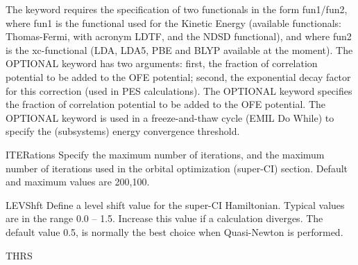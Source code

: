 \begin{keywordlist}
\begin{inputlisting}
\end{inputlisting}
The keyword  requires the specification of two functionals in the form fun1/fun2, where fun1 is the functional
used for the Kinetic Energy (available functionals: Thomas-Fermi, with acronym LDTF, and the NDSD functional), and where
fun2 is the xc-functional (LDA, LDA5, PBE and BLYP available at the moment).
The OPTIONAL keyword  has two arguments: first, the fraction of correlation potential to be added to the OFE potential;
second, the exponential decay factor for this correction (used in PES calculations).
The OPTIONAL keyword  specifies the fraction of correlation potential to be added to the OFE potential.
The OPTIONAL keyword  is used in a freeze-and-thaw cycle (EMIL Do While) to specify the (subsystems) energy convergence threshold.
\item[ITERations]
Specify the maximum number of
 iterations, and the maximum number of iterations used in the orbital
optimization (super-CI) section. Default and maximum values are 200,100.
\item[LEVShft]
Define a level shift value for the super-CI Hamiltonian. Typical values are in the range
0.0 -- 1.5. Increase this value if a calculation diverges. The default value 0.5,
is normally the best choice when Quasi-Newton is performed.
\item[THRS]

\end{keywordlist}
